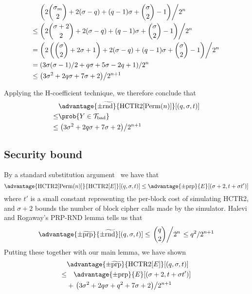\documentclass[hctr.tex]{subfiles}
\begin{document}
\begin{align*}
    & \left.\left(2\binom{\sigma_m}{2} + 2(\sigma - q) + (q-1)\sigma + \binom{\sigma}{2} -1\right)\middle/2^n\right. \\
    \leq & \left.\left(2\binom{\sigma + 2}{2} + 2(\sigma - q) + (q-1)\sigma + \binom{\sigma}{2} -1\right)\middle/2^n\right. \\
    = & \left.\left(2\left(\binom{\sigma}{2} + 2\sigma + 1\right) + 2(\sigma - q) + (q-1)\sigma + \binom{\sigma}{2} -1\right)\middle/2^n\right. \\
    = & \left.\left(3\sigma(\sigma - 1)/2 + q\sigma + 5\sigma - 2q + 1\right)\middle/2^n\right. \\
    \leq & \left.\left(3\sigma^2 + 2q\sigma + 7\sigma + 2\right)\middle/2^{n+1}\right. \\
\end{align*}

Applying the H-coefficient technique, we therefore conclude that
\begin{align*}
    & \advantage{\pm\widetilde{\mathrm{rnd}}}{\HCTR[\Perm(n)]}[(q, \sigma, t)] \\
    \leq & \prob{Y \in \Tb} \\
    \leq & \left.\left(3\sigma^2 + 2q\sigma + 7\sigma + 2\right)\middle/2^{n+1}\right.
\end{align*}

\subsection{Security bound}
By a standard substitution argument~\cite{cbcsec,concrete} we have that
\begin{displaymath}
    \advantage{\HCTR[\Perm(n)]}{\HCTR[E]}[(q, \sigma, t)]
    \leq \advantage{\pm \mathrm{prp}}{E}[(\sigma + 2, t + \sigma t')]
\end{displaymath}
where \(t'\) is a small constant
representing the per-block cost of simulating HCTR2, and
\(\sigma + 2\) bounds the number of block cipher calls made by the simulator.
Halevi and Rogaway's PRP-RND lemma
\cite[Appendix C, Lemma 6]{cmc} tells us that
\begin{displaymath}
    \advantage{\pm \widetilde{\mathrm{prp}}}{\pm\widetilde{\mathrm{rnd}}}[(q, \sigma, t)] 
    \leq \left.\binom{q}{2}\middle/2^n\right.
    \leq q^2/2^{n+1}
\end{displaymath}
Putting these together with our main lemma, we have shown
\begin{align*}
    &\advantage{\pm \widetilde{\mathrm{prp}}}{\HCTR[E]}[(q, \sigma, t)] \\
    \leq & \quad \advantage{\pm \mathrm{prp}}{E}[(\sigma + 2, t + \sigma t')] \\
    &+ \left.\left(3\sigma^2 + 2q\sigma + q^2 + 7\sigma + 2\right)\middle/2^{n+1}\right. \\
\end{align*}
\end{document}
